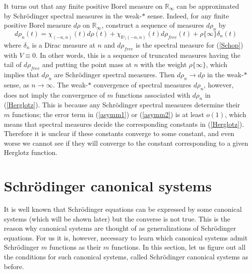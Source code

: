\documentclass[preprint,12pt]{elsarticle}
\newcommand{\R}{{\mathbb R}}
\begin{document}
It turns out that any finite positive Borel measure on $\R_{\infty}$ can be approximated by Schr\"odinger spectral measures in the weak-$*$ sense. Indeed, for any finite positive Borel measure $d\rho$ on $\R_{\infty}$, construct a sequence of measures $d\rho_n$ by 
\begin{equation*}
d\rho_n(t)=\chi_{(-n,n)}(t) d\rho(t)+\chi_{\R \setminus (-n,n)}(t) d\rho_{free}(t)+\rho\{\infty\}\delta_n(t)
\end{equation*}
where $\delta_n$ is a Dirac measure at $n$ and $d\rho_{free}$ is the spectral measure for (\ref{Schop}) with $V\equiv 0$. In other words, this is a sequence of truncated measures having the tail of $d\rho_{free}$ and putting the point mass at $n$ with the weight $\rho\{\infty\}$, which implies that $d\rho_n$ are Schr\"odinger spectral measures. Then $d\rho_n\to d\rho$ in the weak-$*$ sense, as $n\to\infty$. The weak-$*$ convergence of spectral measures $d\rho_n$, however, does not imply the convergence of $m$ functions associated with $d\rho_n$ in (\ref{Herglotz}). This is because any Schr\"odinger spectral measures determine their $m$ functions; the error term in (\ref{asymm1}) or (\ref{asymm2}) is at least $o(1)$, which means that spectral measures  decide the corresponding constants in (\ref{Herglotz}). Therefore it is unclear if these constants converge to some constant, and even worse we cannot see if they will converge to the constant corresponding to a given Herglotz function.\\

\section{Schr\"odinger canonical systems}\label{secScs}
It is well known that Schr\"odinger equations can be expressed by some canonical systems (which will be shown later) but the converse is not true. This is the reason why canonical systems are thought of as generalizations of Schr\"odinger equations. For us it is, however, necessary to learn which canonical systems admit Schr\"odinger $m$ functions as their $m$ functions. In this section, let us figure out all the conditions for such canonical systems, called Schr\"odinger canonical systems as before. 
 
\end{document}
